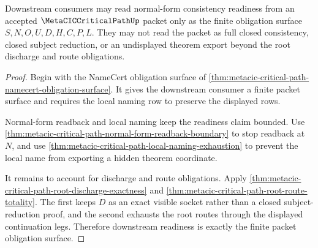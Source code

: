 \begin{theorem}
\label{thm:metacic-critical-path-root-consumer-readiness}
Downstream consumers may read normal-form consistency readiness from an accepted $\MetaCICCriticalPathUp$ packet only as the finite obligation surface $S,N,O,U,D,H,C,P,L$. They may not read the packet as full closed consistency, closed subject reduction, or an undisplayed theorem export beyond the root discharge and route obligations.
\end{theorem}
\begin{proof}
Begin with the NameCert obligation surface of \autoref{thm:metacic-critical-path-namecert-obligation-surface}. It gives the downstream consumer a finite packet surface and requires the local naming row to preserve the displayed rows.

Normal-form readback and local naming keep the readiness claim bounded. Use \autoref{thm:metacic-critical-path-normal-form-readback-boundary} to stop readback at $N$, and use \autoref{thm:metacic-critical-path-local-naming-exhaustion} to prevent the local name from exporting a hidden theorem coordinate.

It remains to account for discharge and route obligations. Apply \autoref{thm:metacic-critical-path-root-discharge-exactness} and \autoref{thm:metacic-critical-path-root-route-totality}. The first keeps $D$ as an exact visible socket rather than a closed subject-reduction proof, and the second exhausts the root routes through the displayed continuation legs. Therefore downstream readiness is exactly the finite packet obligation surface.
\end{proof}

